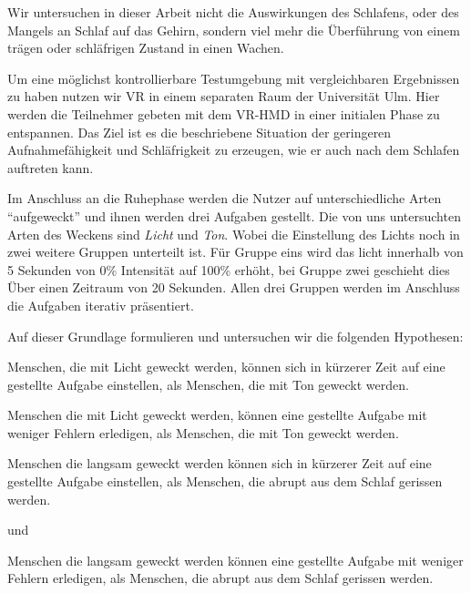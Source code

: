 Wir untersuchen in dieser Arbeit nicht die Auswirkungen des Schlafens, oder des Mangels an Schlaf auf das Gehirn, sondern viel mehr die Überführung von einem trägen oder schläfrigen Zustand in einen Wachen. 

Um eine möglichst kontrollierbare Testumgebung mit vergleichbaren Ergebnissen zu haben nutzen wir VR in einem separaten Raum der Universität Ulm. Hier werden die Teilnehmer gebeten mit dem VR-HMD in einer initialen Phase zu entspannen. Das Ziel ist es die beschriebene Situation der geringeren Aufnahmefähigkeit und Schläfrigkeit zu erzeugen, wie er auch nach dem Schlafen auftreten kann. 

Im Anschluss an die Ruhephase werden die Nutzer auf unterschiedliche Arten "`aufgeweckt"' und ihnen werden drei Aufgaben gestellt. Die von uns untersuchten Arten des Weckens sind \textit{Licht} und \textit{Ton}. Wobei die Einstellung des Lichts noch in zwei weitere Gruppen unterteilt ist. Für Gruppe eins wird das licht innerhalb von 5 Sekunden von 0\% Intensität auf 100\% erhöht, bei Gruppe zwei geschieht dies Über einen Zeitraum von 20 Sekunden. 
Allen drei Gruppen werden im Anschluss die Aufgaben iterativ präsentiert.

Auf dieser Grundlage formulieren und untersuchen wir die folgenden Hypothesen:

\begin{hyp}\label{hyp:lichtSchneller}
	Menschen, die mit Licht geweckt werden, können sich in kürzerer Zeit auf eine gestellte Aufgabe einstellen, als Menschen, die mit Ton geweckt werden.
\end{hyp}

\begin{hyp}\label{hyp:lichtErfolgreicher}
	Menschen die mit Licht geweckt werden, können eine gestellte Aufgabe mit weniger Fehlern erledigen, als Menschen, die mit Ton geweckt werden.
\end{hyp}

\begin{hyp}\label{hyp:langKurzSchneller}
	Menschen die langsam geweckt werden können sich in kürzerer Zeit auf eine gestellte Aufgabe einstellen, als Menschen, die abrupt aus dem Schlaf gerissen werden.
\end{hyp}

und 

\begin{hyp}\label{hyp:langKurzErfolgreicher}
	Menschen die langsam geweckt werden können eine gestellte Aufgabe mit weniger Fehlern erledigen, als Menschen, die abrupt aus dem Schlaf gerissen werden.
\end{hyp}

